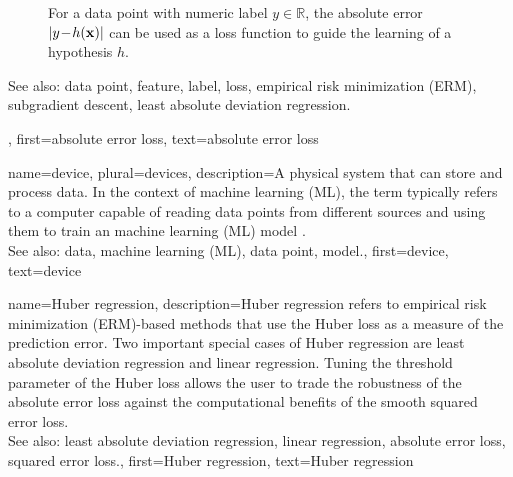 {{{\begin{figure}[H]
\begin{center}
		\end{center}
		\caption{For a data point with numeric label $y\!\in\!\mathbb{R}$, the absolute 
			error $|y\!-\!h({\bf x})|$ can be used as a loss function to guide the 
			learning of a hypothesis $h$. \label{fig_abs_err_dict}}
		\end{figure} 
		See also: data point, feature, label, loss, empirical risk minimization (ERM), subgradient descent, least absolute deviation regression.},
	first={absolute error loss},
	text={absolute error loss}
}

{name={device}, plural={devices}, 
	description={A physical system that can store and process data. In the 
		context of machine learning (ML), the term typically refers to a computer capable of reading 
		data points from different sources and using them to train an machine learning (ML) 
		model \cite{Patterson2013}.
						\\
		See also: data, machine learning (ML), data point, model.},
	first={device},
	text={device}
}



{name={Huber regression},
	description={Huber regression refers to empirical risk minimization (ERM)-based methods 
		that use the Huber loss as a measure of the prediction error. 
		Two important special cases of Huber regression are least absolute deviation regression and 
		linear regression. Tuning the threshold parameter of the Huber loss allows the user
		to trade the robustness of the absolute error loss 
		against the computational benefits of the smooth squared error loss.
					\\
		See also: least absolute deviation regression, linear regression, absolute error loss, squared error loss.},
	first={Huber regression},
	text={Huber regression}
}


}
